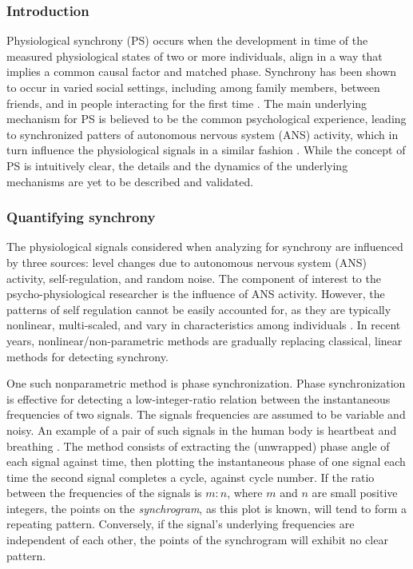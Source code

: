 \documentclass[a4paper, 11pt]{report}      %
\begin{document}
\subsubsection{Introduction}
Physiological synchrony (PS) occurs when the development in time of the measured physiological states of two or more individuals, align in a way that implies a common causal factor and matched phase. Synchrony has been shown to occur in varied social settings, including among family members, between friends, and in people interacting for the first time \citep{palumbo2017interpersonal}. The main underlying mechanism for PS is believed to be the common psychological experience, leading to synchronized patters of autonomous nervous system (ANS) activity, which in turn influence the physiological signals in a similar fashion \citep{palumbo2017interpersonal}. While the concept of PS is intuitively clear, the details and the dynamics of the underlying mechanisms are yet to be described and validated. 


\subsubsection{Quantifying synchrony}
The physiological signals considered when analyzing for synchrony are influenced by three sources: level changes due to autonomous nervous system (ANS) activity, self-regulation, and random noise. The component of interest to the psycho-physiological researcher is the influence of ANS activity. However, the patterns of self regulation cannot be easily accounted for, as they are typically nonlinear, multi-scaled, and vary in characteristics among individuals \citep{ivanov20011}. In recent years, 
nonlinear/non-parametric methods are gradually replacing classical, linear methods for detecting synchrony.

One such nonparametric method is phase synchronization. Phase synchronization is effective for detecting a low-integer-ratio relation between the instantaneous frequencies of two signals. The signals frequencies are assumed to be variable and noisy. An example of a pair of such signals in the human body is heartbeat and breathing \citep{schafer1998heartbeat}. The method consists of extracting the (unwrapped) phase angle of each signal against time, then plotting the instantaneous phase of one signal each time the second signal completes a cycle, against cycle number. If the ratio between the frequencies of the signals is $m:n$, where $m$ and $n$ are small positive integers, the points on the \emph{synchrogram}, as this plot is known, will tend to form a repeating pattern. Conversely, if the signal's underlying frequencies are independent of each other, the points of the synchrogram will exhibit no clear pattern.
\end{document}
